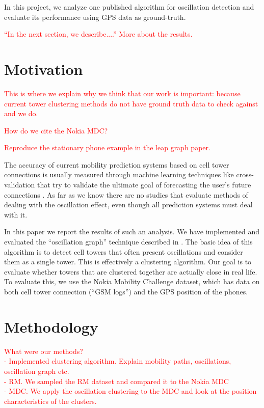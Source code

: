 \documentclass[a4paper,12pt]{article}
\newcommand{\xxx}[1]{\textcolor{red}{#1}}
\begin{document}
In this project, we analyze one published algorithm for oscillation detection \cite{mobilityprofiler} and evaluate its performance using GPS data as ground-truth.

\xxx{``In the next section, we describe....''}
\xxx{More about the results.}

\section{Motivation}

\xxx{This is where we explain why we think that our work is important: because current tower clustering methods do not have ground truth data to check against and we do.}

\xxx{How do we cite the Nokia MDC?}

\xxx{Reproduce the stationary phone example in the leap graph paper.}

The accuracy of current mobility prediction systems based on cell tower connections is usually measured through machine learning techniques like cross-validation that try to validate the ultimate goal of forecasting the user's future connections \cite{LeapGraph}. As far as we know there are no studies that evaluate methods of dealing with the oscillation effect, even though all prediction systems must deal with it.

In this paper we report the results of such an analysis. We have implemented and evaluated the ``oscillation graph'' technique described in \cite{mobilityprofiler}. The basic idea of this algorithm is to detect cell towers that often present oscillations and consider them as a single tower. This is effectively a clustering algorithm. Our goal is to evaluate whether towers that are clustered together are actually close in real life. To evaluate this, we use the Nokia Mobility Challenge dataset, which has data on both cell tower connection (``GSM logs'') and the GPS position of the phones.

\section{Methodology}

\xxx{What were our methods?\\- Implemented clustering algorithm. Explain mobility paths, oscillations, oscillation graph etc. \\- RM. We sampled the RM dataset and compared it to
the Nokia MDC \\- MDC. We apply the oscillation clustering to the MDC and look at the position
characteristics of the clusters.}
\end{document}
